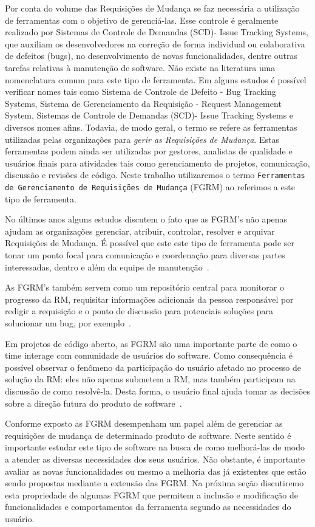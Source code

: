Por conta do volume das Requisições de Mudança se faz necessária a utilização de ferramentas com o
objetivo de gerenciá-las. Esse controle é geralmente realizado por Sistemas de Controle de Demandas
(SCD)- Issue Tracking Systems, que auxiliam os desenvolvedores na correção de forma individual ou
colaborativa de defeitos (bugs), no desenvolvimento de novas funcionalidades, dentre outras tarefas
relativas à manutenção de software. Não existe na literatura uma nomenclatura comum para este tipo
de ferramenta. Em alguns estudos é possível verificar nomes tais como Sistema de Controle de Defeito
- Bug Tracking Systems, Sistema de Gerenciamento da Requisição - Request Management System, Sistemas
de Controle de Demandas (SCD)- Issue Tracking Systems e diversos nomes afins. Todavia, de modo
geral, o termo se refere as ferramentas utilizadas pelas organizações para
\textit{gerir as Requisições de Mudança}. Estas ferramentas podem ainda ser utilizadas por gestores, analistas de
qualidade e usuários finais para atividades tais como gerenciamento de projetos, comunicação,
discussão e revisões de código. Neste trabalho utilizaremos o termo \texttt{Ferramentas de Gerenciamento de Requisições de Mudança} (FGRM) ao referimos a este tipo de ferramenta.

No últimos anos alguns estudos discutem o fato que as FGRM's não apenas ajudam as organizações
gerenciar, atribuir, controlar, resolver e arquivar Requisições de Mudança. É possível que este
este tipo de ferramenta pode ser tonar um ponto focal para comunicação e coordenação para diversas
partes interessadas, dentro e além da equipe de manutenção~\cite{Bertram:2010:CCB:1718918.1718972}.

As FGRM's também servem como um repositório central para monitorar o progresso da RM, requisitar
informações adicionais da pessoa responsável por redigir a requisição e o ponto de discussão para
potenciais soluções para solucionar um bug, por exemplo~\cite{zimmermann2009improving}.

Em projetos de código aberto, as FGRM são uma importante parte de como o time interage com
comunidade de usuários do software. Como consequência é possível observar o fenômeno da participação
do usuário afetado no processo de solução da RM: eles não apenas submetem a RM, mas também
participam na discussão de como resolvê-la. Desta forma, o usuário final ajuda tomar as decisões
sobre a  direção futura do produto de software~\cite{breu2010information}.

Conforme exposto as FGRM desempenham um papel além de gerenciar as requisições de mudança de
determinado produto de software. Neste sentido é importante estudar este tipo de software na busca
de como melhorá-las de modo a atender as diversas necessidades dos seus usuários. Não obstante, é
importante avaliar as novas funcionalidades ou mesmo a melhoria das já existentes que estão sendo
propostas mediante a extensão das FGRM. Na próxima seção discutiremo esta propriedade de algumas
FGRM que permitem a inclusão e modificação de funcionalidades e comportamentos da ferramenta segundo
as necessidades do usuário. 

